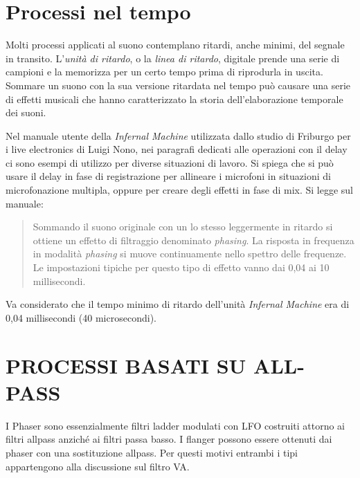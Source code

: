 
\section{Processi nel tempo}

Molti processi applicati al suono contemplano ritardi, anche minimi, del segnale
in transito. L'\emph{unità di ritardo}, o la \emph{linea di ritardo}, digitale
prende una serie di campioni e la memorizza per un certo tempo prima di
riprodurla in uscita. Sommare un suono con la sua versione ritardata nel tempo
può causare una serie di effetti musicali che hanno caratterizzato la storia
dell'elaborazione temporale dei suoni.

Nel manuale utente della \emph{Infernal Machine} utilizzata dallo studio di
Friburgo per i live electronics di Luigi Nono, nei paragrafi dedicati alle
operazioni con il delay ci sono esempi di utilizzo per diverse situazioni di
lavoro. Si spiega che si può usare il delay in fase di registrazione per
allineare i microfoni in situazioni di microfonazione multipla, oppure per
creare degli effetti in fase di mix. Si legge sul manuale:

\begin{quote}
  Sommando il suono originale con un lo stesso leggermente in ritardo si
  ottiene un effetto di filtraggio denominato \emph{phasing}. La risposta in
  frequenza in modalità \emph{phasing} si muove continuamente nello spettro
  delle frequenze. Le impostazioni tipiche per questo tipo di effetto vanno dai
  0,04 ai 10 millisecondi.
\end{quote}

Va considerato che il tempo minimo di ritardo dell'unità \emph{Infernal Machine}
era di 0,04 millisecondi (40 microsecondi).





\section{PROCESSI BASATI SU ALL-PASS}

I Phaser sono essenzialmente filtri ladder modulati con LFO costruiti attorno ai
filtri allpass anziché ai filtri passa basso. I flanger possono essere ottenuti
dai phaser con una sostituzione allpass. Per questi motivi entrambi i tipi
appartengono alla discussione sul filtro VA.

